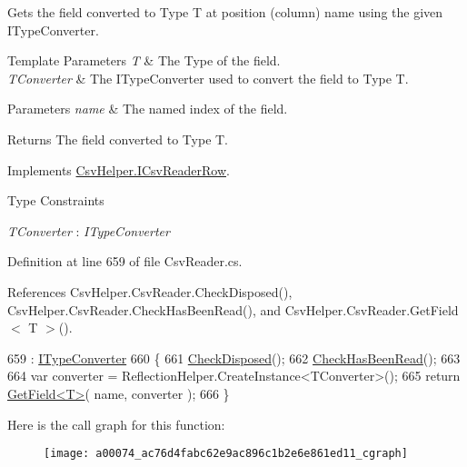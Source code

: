 Gets the field converted to Type T at position (column) name using the given I\-Type\-Converter. 


\begin{DoxyTemplParams}{Template Parameters}
{\em T} & The Type of the field.\\
\hline
{\em T\-Converter} & The I\-Type\-Converter used to convert the field to Type T.\\
\hline
\end{DoxyTemplParams}

\begin{DoxyParams}{Parameters}
{\em name} & The named index of the field.\\
\hline
\end{DoxyParams}
\begin{DoxyReturn}{Returns}
The field converted to Type T.
\end{DoxyReturn}


Implements \hyperlink{a00110_ae7ea281792a1e0e8f64991062a3acffb}{Csv\-Helper.\-I\-Csv\-Reader\-Row}.

\begin{Desc}
\item[Type Constraints]\begin{description}
\item[{\em T\-Converter} : {\em I\-Type\-Converter}]\end{description}
\end{Desc}


Definition at line 659 of file Csv\-Reader.\-cs.



References Csv\-Helper.\-Csv\-Reader.\-Check\-Disposed(), Csv\-Helper.\-Csv\-Reader.\-Check\-Has\-Been\-Read(), and Csv\-Helper.\-Csv\-Reader.\-Get\-Field$<$ T $>$().


\begin{DoxyCode}
659                                                                                  : 
      \hyperlink{a00117}{ITypeConverter}
660         \{
661             \hyperlink{a00074_a6fa45a46ed1322dc1872ca2321b5edbc}{CheckDisposed}();
662             \hyperlink{a00074_a2d9249171ed1568e45d152766d364c31}{CheckHasBeenRead}();
663 
664             var converter = ReflectionHelper.CreateInstance<TConverter>();
665             \textcolor{keywordflow}{return} \hyperlink{a00074_a6a43cfaf39caea93ecd87e506be7b404}{GetField<T>}( name, converter );
666         \}
\end{DoxyCode}


Here is the call graph for this function\-:
\nopagebreak
\begin{figure}[H]
\begin{center}
\leavevmode
\texttt{[image: a00074\_ac76d4fabc62e9ac896c1b2e6e861ed11\_cgraph]}
\end{center}
\end{figure}


